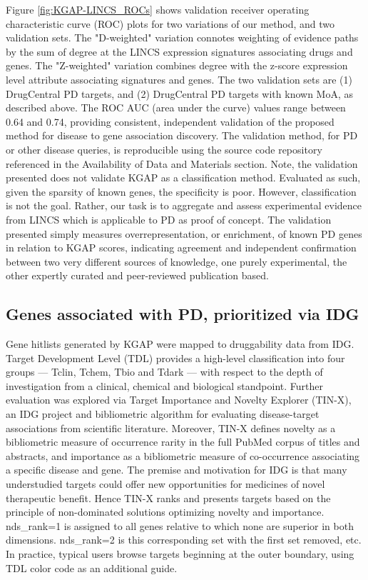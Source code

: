 Figure \ref{fig:KGAP-LINCS_ROCs} shows validation receiver operating characteristic curve (ROC) plots for two variations of our method, and two validation sets. The "D-weighted" variation connotes weighting of evidence paths by the sum of degree at the LINCS expression signatures associating drugs and genes. The "Z-weighted" variation combines degree with the z-score expression level attribute associating signatures and genes. The two validation sets are (1) DrugCentral PD targets, and (2) DrugCentral PD targets with known MoA, as described above.  The ROC AUC (area under the curve) values range between 0.64 and 0.74, providing consistent, independent validation of the proposed method for disease to gene association discovery. The validation method, for PD or other disease queries, is reproducible using the source code repository referenced in the Availability of Data and Materials section. Note, the validation presented does not validate KGAP as a classification method. Evaluated as such, given the sparsity of known genes, the specificity is poor. However, classification is not the goal. Rather, our task is to aggregate and assess experimental evidence from LINCS which is applicable to PD as proof of concept. The validation presented simply measures overrepresentation, or enrichment, of known PD genes in relation to KGAP scores, indicating agreement and independent confirmation between two very different sources of knowledge, one purely experimental, the other expertly curated and peer-reviewed publication based. 

\subsection{Genes associated with PD, prioritized via IDG}

Gene hitlists generated by KGAP were mapped to druggability data from IDG. Target Development Level (TDL) provides a high-level classification into four groups — Tclin, Tchem, Tbio and Tdark — with respect to the depth of investigation from a clinical, chemical and biological standpoint. Further evaluation was explored via Target Importance and Novelty Explorer (TIN-X)\cite{Cannon2017-af}, an IDG project and bibliometric algorithm for evaluating disease-target associations from scientific literature. Moreover, TIN-X defines novelty as a bibliometric measure of occurrence rarity in the full PubMed corpus of titles and abstracts, and importance as a bibliometric measure of co-occurrence associating a specific disease and gene. The premise and motivation for IDG is that many understudied targets could offer new opportunities for medicines of novel therapeutic benefit. Hence TIN-X ranks and presents targets based on the principle of non-dominated solutions optimizing novelty and importance. nds\_rank=1 is assigned to all genes relative to which none are superior in both dimensions. nds\_rank=2 is this corresponding set with the first set removed, etc. In practice, typical users browse targets beginning at the outer boundary, using TDL color code as an additional guide. 


